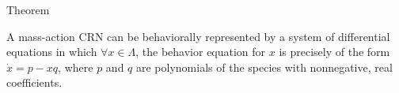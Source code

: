 \begin{frame}{Theorem}
\begin{center}
A mass-action CRN can be behaviorally represented by a system of differential
equations in which $\forall x \in \Lambda$, the behavior equation for $x$ is
precisely of the form $\dot{x} = p - xq$, where $p$ and $q$ are polynomials
of the species with nonnegative, real coefficients.
\end{center}
\end{frame}
